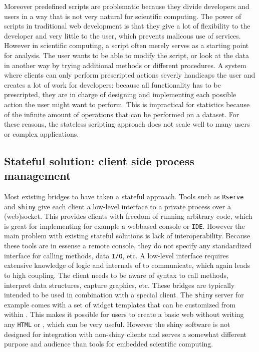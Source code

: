 Moreover predefined scripts are problematic because they divide developers and users in a way that is not very natural for scientific computing. The power of scripts in traditional web development is that they give a lot of flexibility to the developer and very little to the user, which prevents malicous use of services. However in scientific computing, a script often  merely serves as a starting point for analysis. The user wants to be able to modify the script, or look at the data in another way by trying additional methods or different procedures. A system where clients can only perform prescripted actions severly handicaps the user and creates a lot of work for developers: because all functionality has to be prescripted, they are in charge of designing and implementing each possible action the user might want to perform. This is impractical for statistics because of the infinite amount of operations that can be performed on a dataset. For these reasons, the stateless scripting approach does not scale well to many users or complex applications.

\subsection{Stateful solution: client side process management}

Most existing bridges to \R have taken a stateful approach. Tools such as \texttt{Rserve} \citep{urbanek2013rserve} and \texttt{shiny} \citep{shiny} give each client a low-level interface to a private \R process over a (web)socket. This provides clients with freedom of running arbitrary \R code, which is great for implementing for example a webbased console or \texttt{IDE}. However the main problem with existing stateful solutions is lack of interoperability. Because these tools are in essense a remote \R console, they do not specify any standardized interface for calling methods, data \texttt{I/O}, etc. A low-level interface requires extensive knowledge of logic and internals of \R to communicate, which again leads to high coupling. The client needs to be aware of \R syntax to call \R methods, interpret \R data structures, capture graphics, etc. These bridges are typically intended to be used in combination with a special client. The \texttt{shiny} server for example comes with a set of widget templates that can be customized from within \R. 
This makes it possible for \R users to create a basic web \GUI without writing any \texttt{HTML} or \JavaScript, which can be very useful.
However the shiny software is not designed for integration with non-shiny clients and serves a somewhat different purpose and audience than tools for embedded scientific computing.

